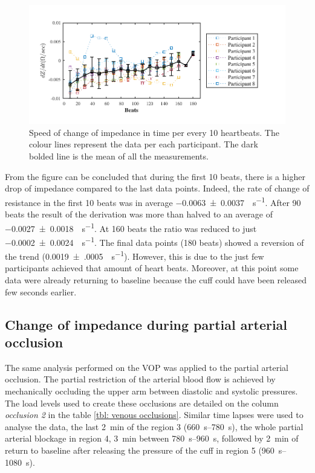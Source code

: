 \begin{figure}[htbp]
	\centering
	\includegraphics[width=15cm,keepaspectratio]{figure_vop_3}    
	\caption[Rate of change of impedance per 10 heartbeats during venous occlusion]{Speed of change of impedance in time per every 10 heartbeats. The colour lines represent the data per each participant. The dark bolded line is the mean of all the measurements.}
	\label{fig:venous occlusion change}
\end{figure}

From the figure can be concluded that during the first 10 beats, there is a higher drop of impedance compared to the last data points. Indeed, the rate of change of resistance in the first 10 beats was in average \SI{-0.0063(00037)}{\Omega\per\second}. After 90 beats the result of the derivation was more than halved to an average of \SI{-0.0027(00018)}{\Omega\per\second}. At 160 beats the ratio was reduced to just \SI{-0.0002(00024)}{\Omega\per\second}. The final data points (180 beats) showed a reversion of the trend (\SI{0.0019(0005)}{\Omega\per\second}). However, this is due to the just few participants achieved that amount of heart beats.  Moreover, at this point some data were already returning to baseline because the cuff could have been released few seconds earlier.  
 

\subsection{Change of impedance during partial arterial occlusion}
\label{section occlusion 1.2}
The same analysis performed on the VOP was applied to the partial arterial occlusion. The partial restriction of the arterial blood flow is achieved by mechanically occluding the upper arm between diastolic and systolic pressures. The load levels used to create these occlusions are detailed on the column \textit{occlusion 2} in the table \ref{tbl: venous occlusions}. Similar time lapses were used to analyse the data, the last \SI{2}{\minute} of the region 3 (\SIrange{660}{780}{\second}), the whole partial arterial blockage in region 4, \SI{3}{\minute} between \SIrange{780}{960}{\second}, followed by \SI{2}{\minute} of return to baseline after releasing the pressure of the cuff in region 5 (\SIrange{960}{1080}{\second}).

